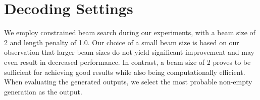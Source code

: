 \section{Decoding Settings}\label{appendix:decoding_settings}
We employ constrained beam search during our experiments, with a beam size of 2 and length penalty of 1.0. Our choice of a small beam size is based on our observation that larger beam sizes do not yield significant improvement and may even result in decreased performance. In contrast, a beam size of 2 proves to be sufficient for achieving good results while also being computationally efficient.
%
When evaluating the generated outputs,
we select the most probable non-empty generation as the output.

